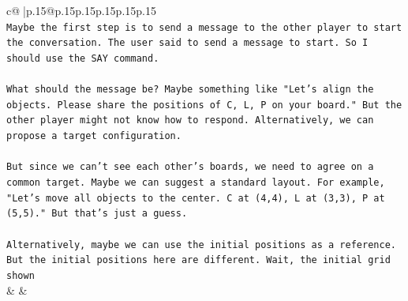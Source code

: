 \documentclass{article}
\begin{document}
{\begin{supertabular}{c@{$\;$}|p{.15\linewidth}@{}p{.15\linewidth}p{.15\linewidth}p{.15\linewidth}p{.15\linewidth}p{.15\linewidth}}
{{{\\ 
\texttt{Maybe the first step is to send a message to the other player to start the conversation. The user said to send a message to start. So I should use the SAY command. } \\
\\ 
\texttt{What should the message be? Maybe something like "Let's align the objects. Please share the positions of C, L, P on your board." But the other player might not know how to respond. Alternatively, we can propose a target configuration. } \\
\\ 
\texttt{But since we can't see each other's boards, we need to agree on a common target. Maybe we can suggest a standard layout. For example, "Let's move all objects to the center. C at (4,4), L at (3,3), P at (5,5)." But that's just a guess. } \\
\\ 
\texttt{Alternatively, maybe we can use the initial positions as a reference. But the initial positions here are different. Wait, the initial grid shown} \\
            }
        }
    }
    & & \\ \\


\end{supertabular}}
\end{document}
